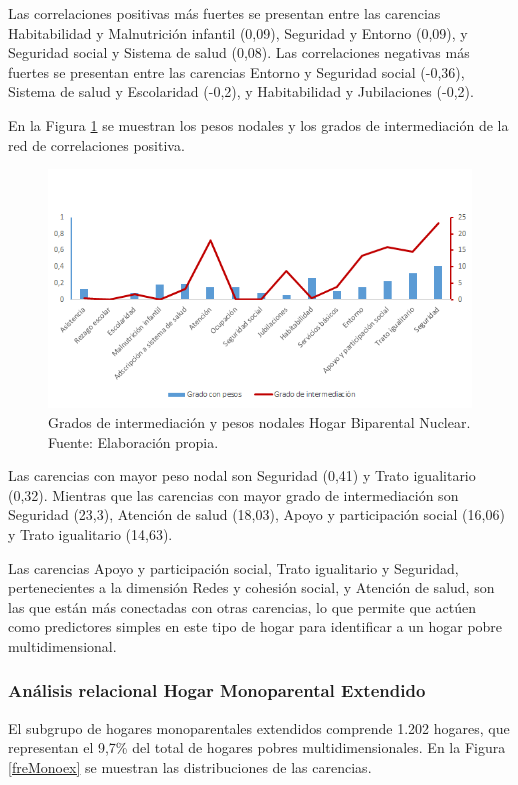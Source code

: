 \documentclass[12pt,letterpaper,spanish]{article}
\begin{document}
Las correlaciones positivas más fuertes se presentan entre las carencias Habitabilidad y Malnutrición infantil (0,09), Seguridad y Entorno (0,09), y Seguridad social y Sistema de salud (0,08). Las correlaciones negativas más fuertes se presentan entre las carencias Entorno y Seguridad social (-0,36), Sistema de salud y Escolaridad (-0,2), y Habitabilidad y Jubilaciones (-0,2).

En la Figura \ref{CenBinuc} se muestran los pesos nodales y los grados de intermediación de la red de correlaciones positiva. 
\begin{figure}[H]
    \centering
    \includegraphics[width=\textwidth]{Grafos/nc_binuc.png}
    \caption{Grados de intermediación y pesos nodales Hogar Biparental Nuclear. Fuente: Elaboración propia.}
    \label{CenBinuc}
\end{figure}
Las carencias con mayor peso nodal son Seguridad (0,41) y Trato igualitario (0,32). Mientras que las carencias con mayor grado de intermediación son Seguridad (23,3), Atención de salud (18,03), Apoyo y participación social (16,06) y Trato igualitario (14,63).

Las carencias Apoyo y participación social, Trato igualitario y Seguridad, pertenecientes a la dimensión Redes y cohesión social, y Atención de salud, son las que están más conectadas con otras carencias, lo que permite que actúen como predictores simples en este tipo de hogar para identificar a un hogar pobre multidimensional.  

\subsubsection{Análisis relacional Hogar Monoparental Extendido}

El subgrupo de hogares monoparentales extendidos comprende 1.202 hogares, que representan el 9,7\% del total de hogares pobres multidimensionales. En la Figura \ref{freMonoex} se muestran las distribuciones de las carencias.
\end{document}
